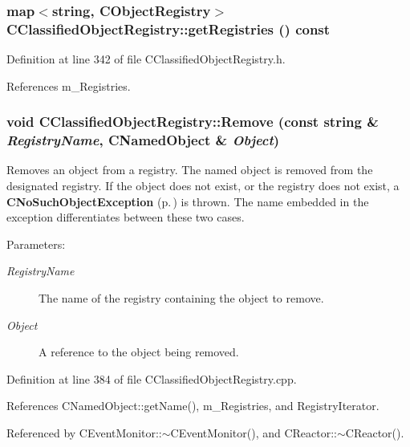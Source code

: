 \subsubsection{\setlength{\rightskip}{0pt plus 5cm}map$<$string, {\bf CObject\-Registry}$>$ CClassified\-Object\-Registry::get\-Registries () const\hspace{0.3cm}{\tt  [inline]}}\label{classCClassifiedObjectRegistry_a2}




Definition at line 342 of file CClassified\-Object\-Registry.h.

References m\_\-Registries.
\subsubsection{\setlength{\rightskip}{0pt plus 5cm}void CClassified\-Object\-Registry::Remove (const string \& {\em Registry\-Name}, {\bf CNamed\-Object} \& {\em Object})}\label{classCClassifiedObjectRegistry_a6}


Removes an object from a registry. The named object is removed from the designated registry. If the object does not exist, or the registry does not exist, a {\bf CNo\-Such\-Object\-Exception} {\rm (p.\,\pageref{classCNoSuchObjectException})} is thrown. The name embedded in the exception differentiates between these two cases.\begin{Desc}
\item[Parameters: ]\par
\begin{description}
\item[{\em 
Registry\-Name}]The name of the registry containing the object to remove. \item[{\em 
Object}]A reference to the object being removed. \end{description}
\end{Desc}


Definition at line 384 of file CClassified\-Object\-Registry.cpp.

References CNamed\-Object::get\-Name(), m\_\-Registries, and Registry\-Iterator.

Referenced by CEvent\-Monitor::$\sim$CEvent\-Monitor(), and CReactor::$\sim$CReactor().
